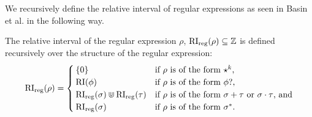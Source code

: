 We recursively define the relative interval of regular expressions as seen in Basin et al. \cite{Basin2020} in the following way.

\begin{definition}
    The relative interval of the regular expression $\rho$, $\operatorname{RI}_{\text{reg}}(\rho) \subseteq \mathbb{Z}$ is defined recursively over the structure of the regular expression:
    \begin{equation*}
        \operatorname{RI}_{\text{reg}}(\rho) =
        \begin{cases}
            \{0\} & \text{if $\rho$ is of the form $\star^k$,} \\
            \operatorname{RI}(\phi) & \text{if $\rho$ is of the form $\phi?$,} \\
            \operatorname{RI}_{\text{reg}}(\sigma) \Cup \operatorname{RI}_{\text{reg}}(\tau) & \text{if $\rho$ is of the form $\sigma + \tau$ or $\sigma \cdot \tau$, and} \\
            \operatorname{RI}_{\text{reg}}(\sigma) & \text{if $\rho$ is of the form $\sigma^*$.}

        \end{cases}
    \end{equation*}
\end{definition}


